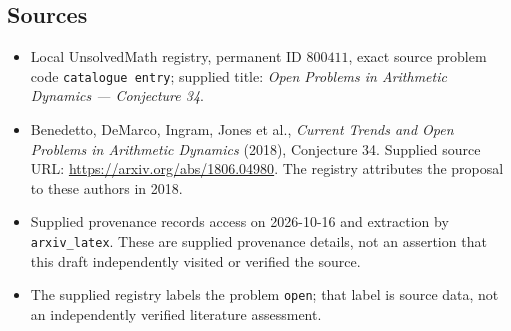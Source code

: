 \documentclass[11pt]{article}
\begin{document}
\subsection{Sources}
\begin{itemize}
\item Local UnsolvedMath registry, permanent ID \(800411\), exact source problem code \texttt{catalogue entry}; supplied title: \emph{Open Problems in Arithmetic Dynamics --- Conjecture 34}.
\item Benedetto, DeMarco, Ingram, Jones et al., \emph{Current Trends and Open Problems in Arithmetic Dynamics} (2018), Conjecture 34. Supplied source URL: \url{https://arxiv.org/abs/1806.04980}. The registry attributes the proposal to these authors in 2018.
\item Supplied provenance records access on 2026-10-16 and extraction by \texttt{arxiv\_latex}. These are supplied provenance details, not an assertion that this draft independently visited or verified the source.
\item The supplied registry labels the problem \texttt{open}; that label is source data, not an independently verified literature assessment.
\end{itemize}
\end{document}
